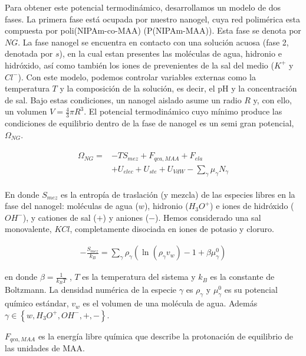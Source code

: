 	Para obtener este potencial termodin\'amico, desarrollamos un modelo de dos fases. La primera fase est\'a ocupada por nuestro nanogel, cuya red polim\'erica esta compuesta por poli(NIPAm-co-MAA) (P(NIPAm-MAA)). Esta fase se denota por $NG$. La fase nanogel se encuentra en contacto con una soluci\'on acuosa (fase 2, denotada por $s$), en la cual estan presentes las mol\'eculas de agua, hidronio e hidr\'oxido, as\'i como tambi\'en los iones de prevenientes de la sal del medio ($K^+$ y $Cl^-$).
	Con este modelo, podemos controlar variables externas como la temperatura $T$ y la composici\'on de la soluci\'on, es decir, el pH y la concentraci\'on de sal. Bajo estas condiciones, un nanogel aislado asume un radio $R$ y, con ello, un volumen $V=\frac{4}{3}\pi R^3$.
	El potencial termodin\'amico cuyo m\'inimo produce las condiciones de equilibrio dentro de la fase de nanogel es un semi gran potencial, $\Omega_{NG}$.
	
	
	
	\begin{align}
		\begin{aligned}
			\Omega_{NG}=& -TS_{mez} + F_{qca,MAA} +  F_{ela}\\
			& + U_{elec}+  U_{ste} + U_{VdW} -{\sum_{\gamma}
				{\mu_\gamma N_\gamma}}
		\end{aligned}
		\label{eq:mc:free-energy-implicit}
	\end{align}
	
	
	\noindent En donde $S_{mez}$ es la entrop\'ia de traslaci\'on (y mezcla) de las especies libres en la fase del nanogel: mol\'eculas de agua ($w$), hidronio ($H_3O^+$) e iones de hidr\'oxido ($OH^-$), y cationes de sal ($+$) y aniones ($-$).
	Hemos considerado una sal monovalente, $KCl$,  completamente disociada en iones de potasio y cloruro.
	
	\begin{align}
		-\frac{S_{mez}}{k_B}	= \sum_{\gamma} \rho_\gamma\left(\ln\left(\rho_\gamma v_w\right) -1 + \beta\mu^0_\gamma\right) 
	\end{align}
	
	\noindent en donde  $\beta=\frac{1}{k_BT}$ , $T$ es la temperatura del sistema  y  $k_B$ es la constante de Boltzmann. La densidad num\'erica de la especie $\gamma$ es $\rho_\gamma$ y $\mu^0_\gamma$ es su potencial qu\'imico est\'andar,  $v_w$ es el volumen de una mol\'ecula de agua. Adem\'as $\gamma \in \left\{ w, H_3O^+, OH^-, +,- \right\}$.
	
	$F_{qca,MAA}$ es la energ\'ia libre qu\'imica que describe la protonaci\'on de equilibrio de las unidades de MAA.
	
